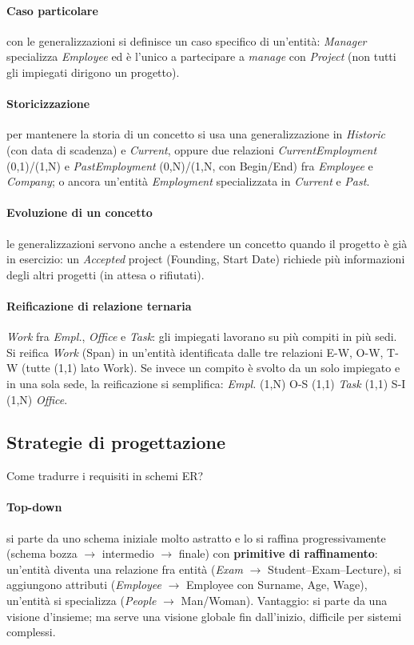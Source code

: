 \documentclass[a4paper,12pt]{article}
\begin{document}
\paragraph{Caso particolare} con le generalizzazioni si definisce un caso
specifico di un'entità: \emph{Manager} specializza \emph{Employee} ed è
l'unico a partecipare a \emph{manage} con \emph{Project} (non tutti gli
impiegati dirigono un progetto).

\paragraph{Storicizzazione} per mantenere la storia di un concetto si usa una
generalizzazione in \emph{Historic} (con data di scadenza) e \emph{Current},
oppure due relazioni \emph{CurrentEmployment} (0,1)/(1,N) e
\emph{PastEmployment} (0,N)/(1,N, con Begin/End) fra \emph{Employee} e
\emph{Company}; o ancora un'entità \emph{Employment} specializzata in
\emph{Current} e \emph{Past}.

\paragraph{Evoluzione di un concetto} le generalizzazioni servono anche a
estendere un concetto quando il progetto è già in esercizio: un
\emph{Accepted} project (Founding, Start Date) richiede più informazioni degli
altri progetti (in attesa o rifiutati).

\paragraph{Reificazione di relazione ternaria} \emph{Work} fra \emph{Empl.},
\emph{Office} e \emph{Task}: gli impiegati lavorano su più compiti in più sedi.
Si reifica \emph{Work} (Span) in un'entità identificata dalle tre relazioni E-W,
O-W, T-W (tutte (1,1) lato Work). Se invece un compito è svolto da un solo
impiegato e in una sola sede, la reificazione si semplifica: \emph{Empl.}
(1,N) O-S (1,1) \emph{Task} (1,1) S-I (1,N) \emph{Office}.

\subsection{Strategie di progettazione}

Come tradurre i requisiti in schemi ER?

\paragraph{Top-down} si parte da uno schema iniziale molto astratto e lo si
raffina progressivamente (schema bozza $\to$ intermedio $\to$ finale) con
\textbf{primitive di raffinamento}: un'entità diventa una relazione fra entità
(\emph{Exam} $\to$ Student--Exam--Lecture), si aggiungono attributi
(\emph{Employee} $\to$ Employee con Surname, Age, Wage), un'entità si
specializza (\emph{People} $\to$ Man/Woman). Vantaggio: si parte da una visione
d'insieme; ma serve una visione globale fin dall'inizio, difficile per sistemi
complessi.
\end{document}
